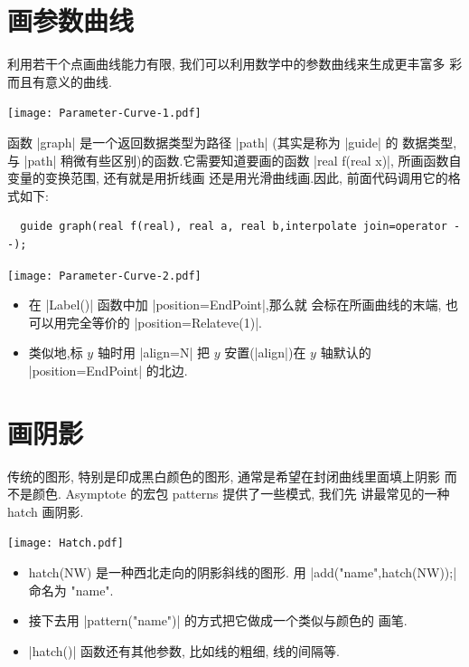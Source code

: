 \documentclass{ctexbook}
\begin{document}
\section{画参数曲线}
利用若干个点画曲线能力有限, 我们可以利用数学中的参数曲线来生成更丰富多
彩而且有意义的曲线.
\begin{center}\texttt{[image: Parameter-Curve-1.pdf]}\end{center}%


函数 |graph| 是一个返回数据类型为路径 |path| (其实是称为 |guide| 的
数据类型, 与 |path| 稍微有些区别)的函数.它需要知道要画的函数
|real f(real x)|,  所画函数自变量的变换范围, 还有就是用折线画
还是用光滑曲线画.因此, 前面代码调用它的格式如下:
\begin{lstlisting}
  guide graph(real f(real), real a, real b,interpolate join=operator --);
\end{lstlisting}
\begin{center}\texttt{[image: Parameter-Curve-2.pdf]}\end{center}%


\begin{itemize}
\item 在 |Label()| 函数中加 |position=EndPoint|,那么就
  会标在所画曲线的末端, 也可以用完全等价的 |position=Relateve(1)|.
\item  类似地,标 $y$ 轴时用 |align=N| 把 $y$ 安置(|align|)在 $y$ 轴默认的
  |position=EndPoint| 的北边.
\end{itemize}

\section{画阴影}
传统的图形, 特别是印成黑白颜色的图形, 通常是希望在封闭曲线里面填上阴影
而不是颜色. Asymptote 的宏包 {patterns} 提供了一些模式, 我们先
讲最常见的一种 hatch 画阴影.
\begin{center}\texttt{[image: Hatch.pdf]}\end{center}%

\begin{itemize}
\item {hatch(NW)} 是一种西北走向的阴影斜线的图形. 用
  |add("name",hatch(NW));| 命名为 "name".
\item 接下去用 |pattern("name")| 的方式把它做成一个类似与颜色的
  画笔.
\item |hatch()| 函数还有其他参数, 比如线的粗细, 线的间隔等.
\end{itemize}
\end{document}

